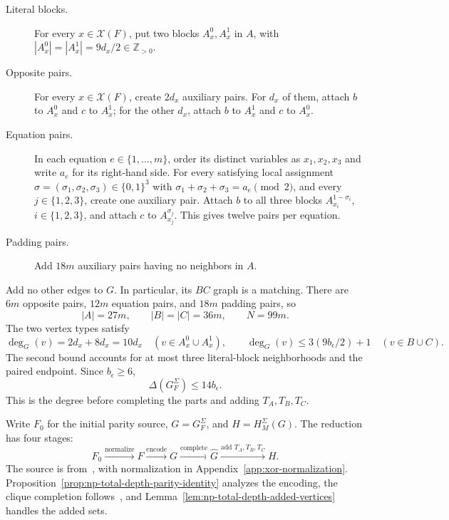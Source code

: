 \begin{description}
\item[Literal blocks.]
 For every $x\in\mathcal X(F)$, put two blocks $A_x^0,A_x^1$ in $A$, with
 $|A_x^0|=|A_x^1|=9d_x/2\in\mathbb Z_{>0}$.
\item[Opposite pairs.]
 For every $x\in\mathcal X(F)$, create $2d_x$ auxiliary pairs. For $d_x$ of them,
 attach $b$ to $A_x^0$ and $c$ to $A_x^1$; for the other $d_x$,
 attach $b$ to $A_x^1$ and $c$ to $A_x^0$.
\item[Equation pairs.]
 In each equation $e\in\{1,\ldots,m\}$, order its distinct variables as $x_1,x_2,x_3$
 and write $a_e$ for its right-hand side. For every satisfying local
 assignment $\sigma=(\sigma_1,\sigma_2,\sigma_3)\in\{0,1\}^3$
 with $\sigma_1+\sigma_2+\sigma_3=a_e\pmod2$, and every
 $j\in\{1,2,3\}$, create one auxiliary pair. Attach $b$ to all
 three blocks $A_{x_i}^{1-\sigma_i}$, $i\in\{1,2,3\}$, and
 attach $c$ to $A_{x_j}^{\sigma_j}$. This gives twelve pairs per
 equation.
\item[Padding pairs.]
 Add $18m$ auxiliary pairs having no neighbors in $A$.
\end{description}
Add no other edges to $G$. In particular, its $BC$ graph is a matching.
There are $6m$ opposite pairs, $12m$ equation pairs, and $18m$ padding
pairs, so
\begin{equation}\label{eq:np-total-depth-part-sizes}
 |A|=27m,\qquad |B|=|C|=36m,\qquad N=99m.
\end{equation}
The two vertex types satisfy
\[
 \deg_G(v)=2d_x+8d_x=10d_x
 \quad(v\in A_x^0\cup A_x^1),\qquad
 \deg_G(v)\leq3(9b_\epsilon/2)+1
 \quad(v\in B\cup C).
\]
The second bound accounts for at most three literal-block
neighborhoods and the paired endpoint. Since $b_\epsilon\geq6$,
\begin{equation}\label{eq:np-total-depth-degree}
 \Delta(G_F^\Sigma)\leq14b_\epsilon.
\end{equation}
This is the degree before completing the parts and adding $T_A,T_B,T_C$.

Write $F_0$ for the initial parity source, $G=G_F^\Sigma$, and
$H=H^\Sigma_M(G)$. The reduction has four stages:
\[
 F_0\xrightarrow{\text{normalize}}F
 \xrightarrow{\text{encode}}G
 \xrightarrow{\text{complete}}\widehat G
 \xrightarrow{\text{add }T_A,T_B,T_C}H.
\]
The source is from~\cite[Theorem~10]{HazanSafraSchwartz2003}, with
normalization in Appendix~\ref{app:xor-normalization}.
Proposition~\ref{prop:np-total-depth-parity-identity} analyzes the
encoding, the clique completion follows~\cite[Section~3.1]{BonnetTreewidth},
and Lemma~\ref{lem:np-total-depth-added-vertices} handles the added sets.

